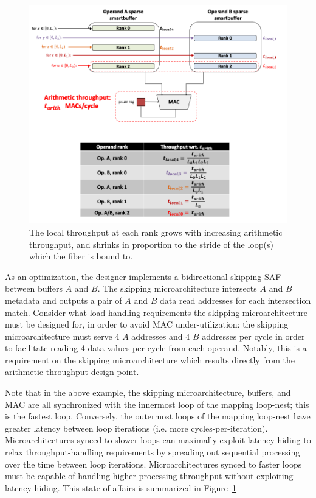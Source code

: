 \begin{itemize}
    \begin{figure}[H]
        \centering
        \includegraphics[width=\linewidth]{figures/local_throughput_diagram.png}
        \caption{The local throughput at each rank grows with increasing arithmetic throughput, and shrinks in proportion to the stride of the loop(s) which the fiber is bound to.}
        \label{fig:local_throughput_diagram}
    \end{figure}

    As an optimization, the designer implements a bidirectional skipping SAF between buffers $A$ and $B$. The skipping microarchitecture intersects $A$ and $B$ metadata and outputs a pair of $A$ and $B$ data read addresses for each intersection match. Consider what load-handling requirements the skipping microarchitecture must be designed for, in order to avoid MAC under-utilization: the skipping microarchitecture must serve $4$ $A$ addresses and $4$ $B$ addresses per cycle in order to facilitate reading 4 data values per cycle from each operand. Notably, this is a requirement on the skipping microarchitecture which results directly from the arithmetic throughput design-point.

    Note that in the above example, the skipping microarchitecture, buffers, and MAC are all synchronized with the innermost loop of the mapping loop-nest; this is the fastest loop. Conversely, the outermost loops of the mapping loop-nest have greater latency between loop iterations (i.e. more cycles-per-iteration). Microarchitectures synced to slower loops can maximally exploit latency-hiding to relax throughput-handling requirements by spreading out sequential processing over the time between loop iterations. Microarchitectures synced to faster loops must be capable of handling higher processing throughput without exploiting latency hiding. This state of affairs is summarized in Figure~\ref{fig:local_throughput_diagram}
    

\end{itemize}

